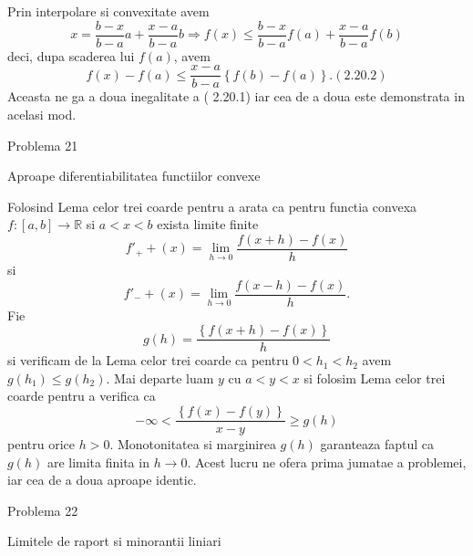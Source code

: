 \documentclass[a4paper,12pt,oneside]{report}
\begin{document}
Prin interpolare si convexitate avem
\begin{displaymath}
    x = \frac{b - x}{b - a}a + \frac{x - a}{b - a }b \Rightarrow f\left ( x \right ) \leq \frac{b - x}{b - a}f\left ( a \right ) + \frac{x - a}{b - a }f\left ( b \right )
\end{displaymath}
 deci, dupa scaderea lui \(f\left ( a \right )\), avem
 \begin{displaymath}
     f\left ( x \right ) - f\left ( a \right )\leq \frac{x - a}{b - a }\left \{ f\left ( b \right ) - f\left ( a \right ) \right \}. (2.20.2)
 \end{displaymath}
Aceasta ne ga a doua inegalitate a ( 2.20.1) iar cea de a doua este demonstrata in acelasi mod. 


Problema 21

Aproape diferentiabilitatea functiilor convexe 

Folosind Lema celor trei coarde pentru a arata ca pentru functia convexa \(f : \left [ a,b \right ]  \to \mathbb{R}\) si \(a< x< b\) exista limite finite
\begin{displaymath}
    {f}'_{+} + \left ( x \right ) = \lim_{h  \to 0}\frac{f\left ( x + h \right ) - f\left ( x \right )}{h} 
\end{displaymath}
si 
\begin{displaymath}
    {f}'_{-} + \left ( x \right ) = \lim_{h  \to 0}\frac{f\left ( x - h \right ) - f\left ( x \right )}{h}.
\end{displaymath}
Fie 
\begin{displaymath}
    g\left ( h \right ) = \frac{\left \{ f\left ( x + h \right ) - f\left ( x \right ) \right \}}{h}
\end{displaymath}
 si verificam de la Lema celor trei coarde ca pentru \(0 < h_{1} < h_{2}\) avem \(g\left ( h_{1} \right )\leq g\left ( h_{2} \right )\). Mai departe luam \(y\) cu \(a <  y < x \) si folosim Lema celor trei coarde pentru a verifica ca
 \begin{displaymath}
    -\infty < \frac{\left \{ f\left ( x \right ) - f\left ( y \right ) \right \}}{x - y}\geq g\left ( h \right )
 \end{displaymath}
 pentru orice \(h> 0\). Monotonitatea si marginirea \(g\left ( h \right )\) garanteaza faptul ca \(g\left ( h \right )\) are limita finita in \(h \to 0\). Acest lucru ne ofera prima jumatae a problemei, iar cea de a doua aproape identic. 

Problema 22

Limitele de raport si minorantii liniari 
\end{document}
